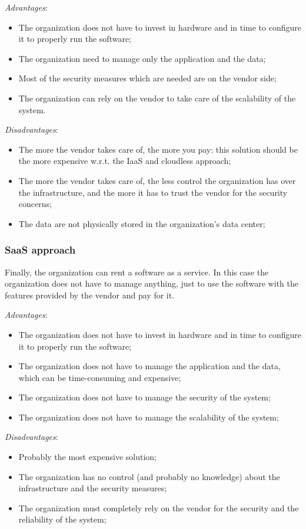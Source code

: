 \textit{Advantages}:
\begin{itemize}
    \itemsep0em
    \item The organization does not have to invest in hardware and in time to configure it to properly run the software;
    \item The organization need to manage only the application and the data;
    \item Most of the security measures which are needed are on the vendor side;
    \item The organization can rely on the vendor to take care of the scalability of the system.
\end{itemize}
\textit{Disadvantages}:
\begin{itemize}
    \itemsep0em
    \item The more the vendor takes care of, the more you pay: this solution should be the more expensive w.r.t. the IaaS and cloudless approach;
    \item The more the vendor takes care of, the less control the organization has over the infrastructure, and the more it has to trust the vendor for the security concerns;
    \item The data are not physically stored in the organization's data center;
\end{itemize}

\subsubsection{SaaS approach}
\label{subsubsec:saas}
Finally, the organization can rent a software as a service. In this case the organization does not have to manage anything, just to use the software with the features provided by the vendor and pay for it.

\textit{Advantages}:
\begin{itemize}
    \itemsep0em
    \item The organization does not have to invest in hardware and in time to configure it to properly run the software;
    \item The organization does not have to manage the application and the data, which can be time-consuming and expensive;
    \item The organization does not have to manage the security of the system;
    \item The organization does not have to manage the scalability of the system;
\end{itemize}
\textit{Disadvantages}:
\begin{itemize}
    \item Probably the most expensive solution;
    \item The organization has no control (and probably no knowledge) about the infrastructure and the security measures;
    \item The organization must completely rely on the vendor for the security and the reliability of the system;
\end{itemize}





